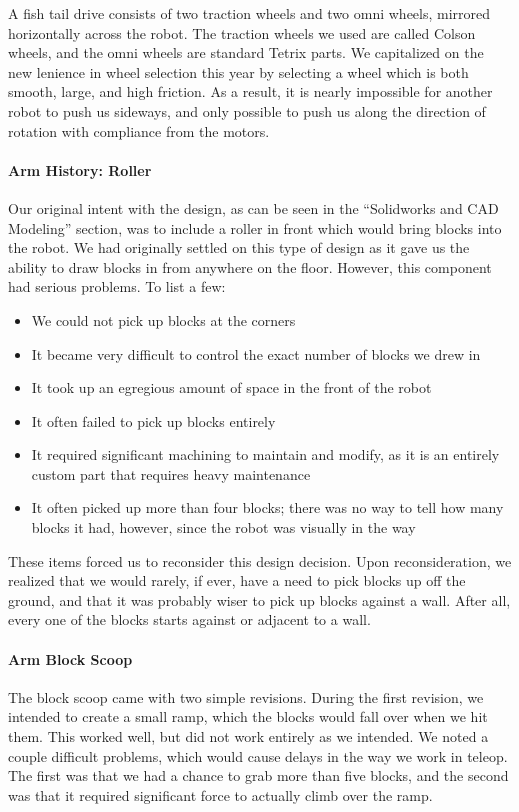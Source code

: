 A fish tail drive consists of two traction wheels and two omni wheels, mirrored horizontally across the robot. The traction wheels we used are called Colson wheels, and the omni wheels are standard Tetrix parts. We capitalized on the new lenience in wheel selection this year by selecting a wheel which is both smooth, large, and high friction. As a result, it is nearly impossible for another robot to push us sideways, and only possible to push us along the direction of rotation with compliance from the motors.

\paragraph{Arm History: Roller} Our original intent with the design, as can be seen in the ``Solidworks and CAD Modeling'' section, was to include a roller in front which would bring blocks into the robot. We had originally settled on this type of design as it gave us the ability to draw blocks in from anywhere on the floor. However, this component had serious problems. To list a few:

\begin{itemize}
	\item{We could not pick up blocks at the corners}
	\item{It became very difficult to control the exact number of blocks we drew in}
	\item{It took up an egregious amount of space in the front of the robot}
	\item{It often failed to pick up blocks entirely}
	\item{It required significant machining to maintain and modify, as it is an entirely custom part that requires heavy maintenance}
	\item{It often picked up more than four blocks; there was no way to tell how many blocks it had, however, since the robot was visually in the way}
\end{itemize}

These items forced us to reconsider this design decision. Upon reconsideration, we realized that we would rarely, if ever, have a need to pick blocks up off the ground, and that it was probably wiser to pick up blocks against a wall. After all, every one of the blocks starts against or adjacent to a wall.

\paragraph{Arm Block Scoop} The block scoop came with two simple revisions. During the first revision, we intended to create a small ramp, which the blocks would fall over when we hit them. This worked well, but did not work entirely as we intended. We noted a couple difficult problems, which would cause delays in the way we work in teleop. The first was that we had a chance to grab more than five blocks, and the second was that it required significant force to actually climb over the ramp. 

